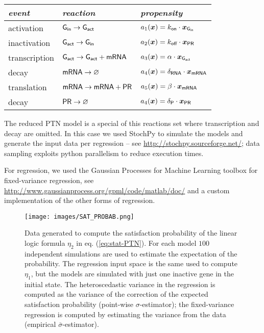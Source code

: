 \documentclass[runningheads,a4paper]{llncs}
\newcommand{\tstat}{\eta} %
\newcommand{\xx}{\boldsymbol{x}}
\newcommand{\PR}{{{\sf{PR}}}}
\newcommand{\PTN}{{\sf PTN}}
\newcommand{\GEI}{{\sf{G}_{\text{\sf in}}}}
\newcommand{\GEA}{{\sf{G}_{\text{\sf act}}}}
\newcommand{\RNA}{{\sf{mRNA}}}
\begin{document}
\begin{center}
\begin{tabular}{p{3.0cm}p{5.0cm}l}
{\em event} & {\em reaction} & {\em propensity}\\\hline
{\sf activation}& $\GEI \to \GEA$ &$ a_1(\xx) =  {k_{\text{\sf on}}} \cdot \xx_\GEI$\\
{\sf inactivation} & $\GEA \to \GEI$ &$ a_2(\xx) = {k_{\text{\sf off}}\cdot\xx_\PR{}}$\\
{\sf transcription} & $\GEA \to \GEA+\RNA$ &$a_3(\xx) = \alpha\cdot\xx_\GEA{}$\\
{\sf \RNA{} decay} & $\RNA \to \varnothing$ &$a_4(\xx) = {\delta_{\text{\sf RNA}}}\cdot\xx_\RNA{}$\\
{\sf translation} & $\RNA \to \RNA+\PR$ &$a_5(\xx) = \beta\cdot\xx_\RNA{}$\\
{\sf \PR{} decay} & $\PR \to \varnothing$ &$a_4(\xx) = {\delta_{\text{\sf P}}}\cdot\xx_\PR{}$
\end{tabular}
\end{center}
The reduced \PTN{} model is a special of this reactions set where    {\sf transcription} and {\sf \RNA{} decay} are omitted. In this case we used {\sf StochPy} to simulate the models and generate the input data per regression -- see \url{http://stochpy.sourceforge.net/}; data sampling exploits {\sf python} parallelism to reduce execution times.

For regression, we used the {\sf Gaussian Processes for Machine Learning} toolbox for fixed-variance regression, see \url{http://www.gaussianprocess.org/gpml/code/matlab/doc/} and a custom implementation of the other forms of regression.


\begin{figure}[t]
\center
\texttt{[image: images/SAT\_PROBAB.png]}
\caption{Data generated to compute the satisfaction probability of the linear logic formula $\tstat_2$ in eq. (\ref{eq:stat-PTN}). For each model $100$ independent simulations are used to estimate the expectation of the probability. The regression input space is the same used to compute $\tstat_1$, but the models are simulated with just one inactive gene in the initial state. The heteroscedastic variance in the regression is computed as the variance of the correction of the expected satisfaction probability (point-wise $\sigma$-estimator); the fixed-variance regression is computed by estimating the variance from the data (empirical $\overline{\sigma}$-estimator).}
\label{fig:TR-prob-data}
\end{figure}
\end{document}
